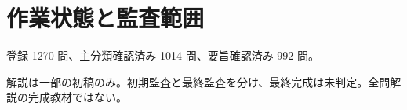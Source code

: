 \chapter{作業状態と監査範囲}
登録 1270 問、主分類確認済み 1014 問、要旨確認済み 992 問。
\par 解説は一部の初稿のみ。初期監査と最終監査を分け、最終完成は未判定。全問解説の完成教材ではない。
